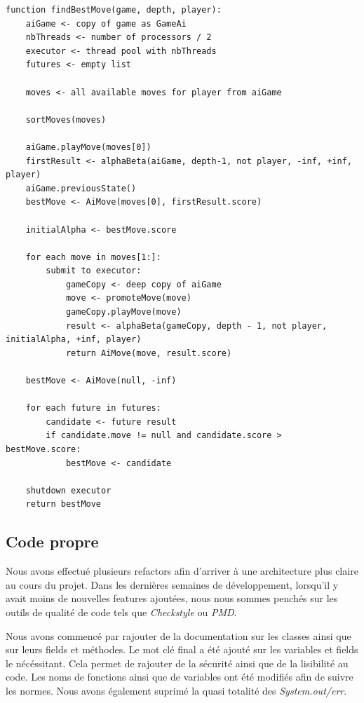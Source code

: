 \documentclass{article}
\begin{document}
\pagebreak
\begin{lstlisting}[label={AlphaBetaParallel}, caption={AlphaBeta version parallèle - pseudo-code}]
function findBestMove(game, depth, player):
    aiGame <- copy of game as GameAi
    nbThreads <- number of processors / 2
    executor <- thread pool with nbThreads
    futures <- empty list

    moves <- all available moves for player from aiGame

    sortMoves(moves)

    aiGame.playMove(moves[0])
    firstResult <- alphaBeta(aiGame, depth-1, not player, -inf, +inf, player)
    aiGame.previousState()
    bestMove <- AiMove(moves[0], firstResult.score)

    initialAlpha <- bestMove.score

    for each move in moves[1:]:
        submit to executor:
            gameCopy <- deep copy of aiGame
            move <- promoteMove(move)
            gameCopy.playMove(move)
            result <- alphaBeta(gameCopy, depth - 1, not player, initialAlpha, +inf, player)
            return AiMove(move, result.score)

    bestMove <- AiMove(null, -inf)

    for each future in futures:
        candidate <- future result
        if candidate.move != null and candidate.score > bestMove.score:
            bestMove <- candidate

    shutdown executor
    return bestMove
    \end{lstlisting}
    \FloatBarrier


\subsection{Code propre}
Nous avons effectué plusieurs refactors afin d'arriver à une architecture plus claire au cours du projet. Dans les dernières semaines de développement,
lorsqu'il y avait moins de nouvelles features ajoutées, nous nous sommes penchés sur les outils de qualité de code tels que \textit{Checkstyle} ou \textit{PMD}.

Nous avons commencé par rajouter de la documentation sur les classes ainsi que sur leurs fields et méthodes.
Le mot clé final a été ajouté sur les variables et fields le nécéssitant. Cela permet de rajouter de la sécurité ainsi que de la lisibilité au code.
Les noms de fonctions ainsi que de variables ont été modifiés afin de suivre les normes. Nous avons également suprimé la quasi totalité des \textit{System.out/err}.
\end{document}
